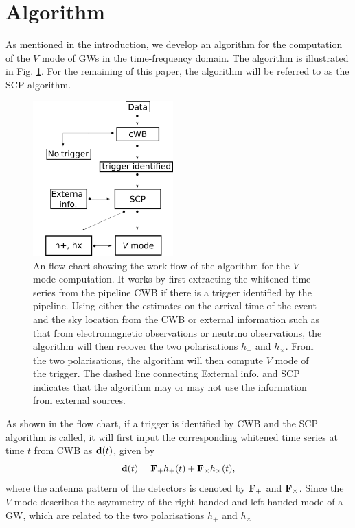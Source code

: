 \documentclass[aps,twocolumn,showpacs,groupedaddress, nofootinbib]{revtex4}  %
\begin{document}
\section{Algorithm}\label{sec:al}
As mentioned in the introduction, we develop an algorithm for the computation of the $V$ mode of \acp{GW} in the time-frequency domain.
The algorithm is illustrated in Fig. \ref{fig:flowchart}. For the remaining of this paper, the algorithm will be referred to as the \ac{SCP} algorithm.
\begin{figure}
\includegraphics[width=0.48\textwidth]{flowchart.png}
\caption{An flow chart showing the work flow of the algorithm for the $V$ mode computation.
It works by first extracting the whitened time series from the pipeline \ac{CWB} if there is a trigger identified by the pipeline. 
Using either the estimates on the arrival time of the event and the sky location from the \ac{CWB} or 
external information such as that from electromagnetic observations or neutrino observations, 
the algorithm will then recover the two polarisations $h_+$ and $h_{\times}$.
From the two polarisations, the algorithm will then compute $V$ mode of the trigger.
The dashed line connecting External info. and SCP indicates that the algorithm may or may not use the information from external sources.
\label{fig:flowchart}}
\end{figure}
As shown in the flow chart, if a trigger is identified by \ac{CWB} and the \ac{SCP} algorithm is called, 
it will first input the corresponding whitened time series at time $t$ from \ac{CWB} as $\bold{d}(t)$, given by
\begin{equation}
 \bold{d}(t) = \bold{F}_{+}h_{+}(t) + \bold{F}_{\times}h_{\times}(t),
\end{equation}
where the antenna pattern of the detectors is denoted by $\bold{F}_+$ and $\bold{F}_{\times}$.
Since the $V$ mode describes the asymmetry of the right-handed and left-handed mode of a \ac{GW}, which are related to the two polarisations $h_{+}$ and $h_{\times}$
\end{document}
